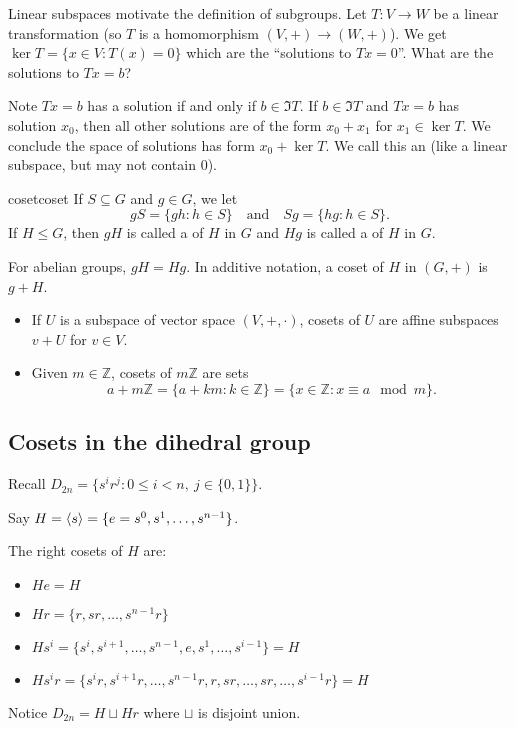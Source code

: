 \documentclass[12pt,letterpaper]{report}
\begin{document}
Linear subspaces motivate the definition of subgroups.
Let $T \colon V \to W$ be a linear transformation (so $T$ is a homomorphism $(V, +) \to (W, +)$).
We get $\ker T = \{x \in V : T(x) = 0\}$ which are the ``solutions to $Tx = 0$''.
What are the solutions to $Tx = b$?

Note $Tx = b$ has a solution if and only if $b \in \Im T$.
If $b \in \Im T$ and $Tx = b$ has solution $x_0$, then all other solutions are of the form
$x_0 + x_1$ for $x_1 \in \ker T$.
We conclude the space of solutions has form $x_0 + \ker T$.
We call this an  (like a linear subspace, but may not contain 0).

\begin{defn}{coset}{coset}
  If $S \subseteq G$ and $g \in G$, we let
  \[ gS = \{gh : h \in S\} \quad \text{and} \quad Sg = \{hg : h \in S\}. \]
  If $H \leq G$, then $gH$ is called a  of $H$ in $G$ and $Hg$ is called a
   of $H$ in $G$.
\end{defn}

For abelian groups, $gH = Hg$.
In additive notation, a coset of $H$ in $(G, +)$ is $g + H$.

\begin{ex}
  \begin{itemize}
    \item
    If $U$ is a subspace of vector space $(V, +, \cdot)$, cosets of $U$ are affine subspaces
    $v + U$ for $v \in V$.
    \item
    Given $m \in \mathbb{Z}$, cosets of $m\mathbb{Z}$ are sets
    \[
      a + m\mathbb{Z} = \{a + km : k \in \mathbb{Z}\} = \{x \in \mathbb{Z} : x \equiv a \mod{m}\}.
    \]
  \end{itemize}
\end{ex}

\pagebreak
\subsection{Cosets in the dihedral group}

Recall $D_{2n} = \{s^i r^j : 0 \leq i < n, \ j \in \{0, 1\}\}$.

Say $H = \langle s\rangle = \{e = s^0, s^1, \ldots, s^{n - 1}\}$.

The right cosets of $H$ are:
\begin{itemize}
  \item $He = H$
  \item $Hr = \{r, sr, \ldots, s^{n - 1}r\}$
  \item $Hs^i = \{s^i, s^{i + 1}, \ldots, s^{n - 1}, e, s^1, \ldots, s^{i - 1}\} = H$
  \item $Hs^i r = \{s^i r, s^{i + 1}r, \ldots, s^{n - 1}r, r, sr, \ldots, sr, \ldots, s^{i - 1}r\}
    = H$
\end{itemize}
Notice $D_{2n} = H \sqcup Hr$ where $\sqcup$ is disjoint union.
\end{document}

